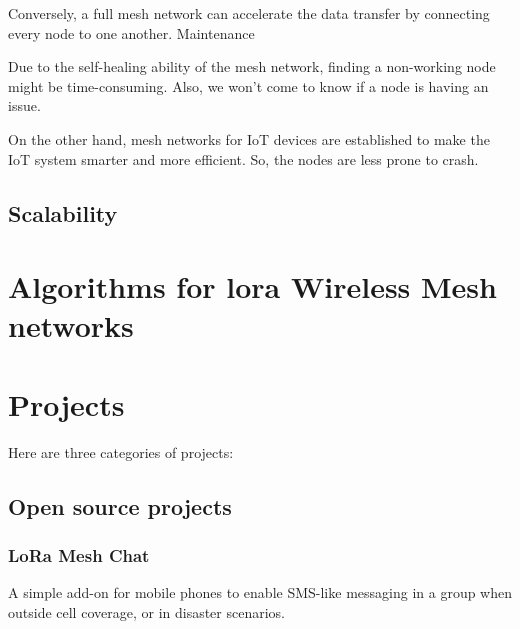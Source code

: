 			Conversely, a full mesh network can accelerate the data transfer by connecting every node to one another.
			Maintenance
			
			Due to the self-healing ability of the mesh network, finding a non-working node might be time-consuming. Also, we won’t come to know if a node is having an issue.
			
			On the other hand, mesh networks for IoT devices are established to make the IoT system smarter and more efficient. So, the nodes are less prone to crash.
	
		\subsection{Scalability}
		
			
			
	
	\section{Algorithms for lora Wireless Mesh networks}
	
	
	\section{Projects}\label{sec:chap4_projects}
		
		Here are three categories of projects:
		
		\subsection{Open source projects}
		
			\subsubsection{LoRa Mesh Chat}
			
				A simple add-on for mobile phones to enable SMS-like messaging in a group when outside cell coverage, or in disaster scenarios.
				
